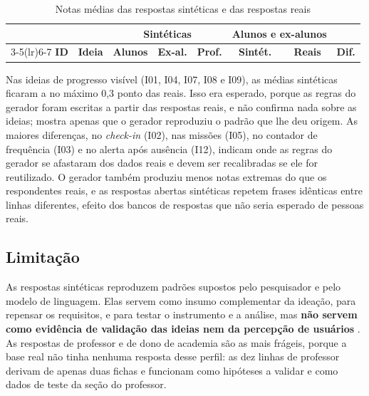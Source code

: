 \begin{table}[!htb]
  \centering
  \caption{Notas médias das respostas sintéticas e das respostas reais}
  \label{tab:personas-comparacao}
  \footnotesize
  \begin{tabular}{clcccccc}
    \toprule
    & & \multicolumn{3}{c}{\textbf{Sintéticas}} & \multicolumn{2}{c}{\textbf{Alunos e ex-alunos}} & \\
    \cmidrule(lr){3-5}\cmidrule(lr){6-7}
    \textbf{ID} & \textbf{Ideia} & \textbf{Alunos} & \textbf{Ex-al.} & \textbf{Prof.} & \textbf{Sintét.} & \textbf{Reais} & \textbf{Dif.} \\
    \midrule
  \end{tabular}
\end{table}

Nas ideias de progresso visível (I01, I04, I07, I08 e I09), as médias
sintéticas ficaram a no máximo 0,3 ponto das reais. Isso era esperado,
porque as regras do gerador foram escritas a partir das respostas reais, e
não confirma nada sobre as ideias; mostra apenas que o gerador reproduziu
o padrão que lhe deu origem. As maiores diferenças, no \textit{check-in}
(I02), nas missões (I05), no contador de frequência (I03) e no alerta após
ausência (I12), indicam onde as regras do gerador se afastaram dos dados
reais e devem ser recalibradas se ele for reutilizado. O gerador também produziu menos notas extremas do que os respondentes
reais, e as respostas abertas sintéticas repetem frases idênticas entre
linhas diferentes, efeito dos bancos de respostas que não seria esperado
de pessoas reais.

\subsection{Limitação}

As respostas sintéticas reproduzem padrões supostos pelo pesquisador e
pelo modelo de linguagem. Elas servem como insumo complementar da
ideação, para repensar os requisitos, e para testar o instrumento e a
análise, mas \textbf{não servem como evidência de validação das ideias
nem da percepção de usuários}
\cite{argyle2023,aher2023}. As respostas de professor e de dono de
academia são as mais frágeis, porque a base real não tinha nenhuma
resposta desse perfil: as dez linhas de professor derivam de apenas duas
fichas e funcionam como hipóteses a validar e como dados de teste da
seção do professor.


